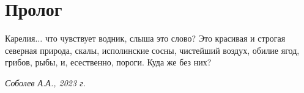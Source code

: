 {
\cleardoublepage
{}

\fancyhead[LE]{\fancyplain{}{}}
\fancyhead[RO]{\fancyplain{}{}}

\section*{Пролог}

Карелия$\ldots$ что чувствует водник, слыша это слово? Это красивая и строгая северная природа, скалы, исполинские сосны, чистейший воздух, обилие ягод, грибов, рыбы, и, есественно, пороги. Куда же без них?

\begin{flushright}
	\textit{Соболев А.А., 2023 г.}
\end{flushright}

}
\fancyhead[LE]{\fancyplain{}{\bfseries \parttitle}}
\fancyhead[RO]{\fancyplain{}{\bfseries \rightmark}}